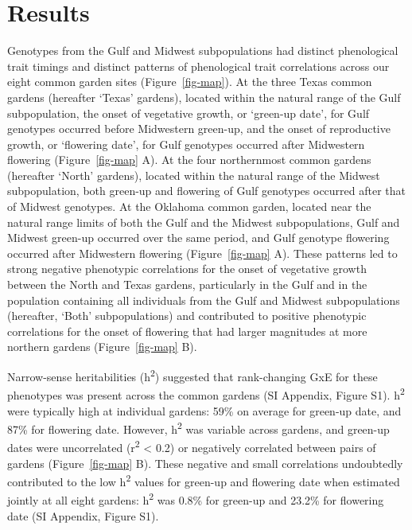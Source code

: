\documentclass[
  9pt,
  twocolumn,
  twoside]{pnas-new}
\begin{document}
\section{Results}\label{results}

Genotypes from the Gulf and Midwest subpopulations had distinct
phenological trait timings and distinct patterns of phenological trait
correlations across our eight common garden sites
(Figure~\ref{fig-map}). At the three Texas common gardens (hereafter
`Texas' gardens), located within the natural range of the Gulf
subpopulation, the onset of vegetative growth, or `green-up date', for
Gulf genotypes occurred before Midwestern green-up, and the onset of
reproductive growth, or `flowering date', for Gulf genotypes occurred
after Midwestern flowering (Figure~\ref{fig-map} A). At the four
northernmost common gardens (hereafter `North' gardens), located within
the natural range of the Midwest subpopulation, both green-up and
flowering of Gulf genotypes occurred after that of Midwest genotypes. At
the Oklahoma common garden, located near the natural range limits of
both the Gulf and the Midwest subpopulations, Gulf and Midwest green-up
occurred over the same period, and Gulf genotype flowering occurred
after Midwestern flowering (Figure~\ref{fig-map} A). These patterns led
to strong negative phenotypic correlations for the onset of vegetative
growth between the North and Texas gardens, particularly in the Gulf and
in the population containing all individuals from the Gulf and Midwest
subpopulations (hereafter, `Both' subpopulations) and contributed to
positive phenotypic correlations for the onset of flowering that had
larger magnitudes at more northern gardens (Figure~\ref{fig-map} B).

Narrow-sense heritabilities (h\textsuperscript{2}) suggested that
rank-changing GxE for these phenotypes was present across the common
gardens (SI Appendix, Figure S1). h\textsuperscript{2} were typically
high at individual gardens: 59\% on average for green-up date, and 87\%
for flowering date. However, h\textsuperscript{2} was variable across
gardens, and green-up dates were uncorrelated (r\textsuperscript{2}
\textless{} 0.2) or negatively correlated between pairs of gardens
(Figure~\ref{fig-map} B). These negative and small correlations
undoubtedly contributed to the low h\textsuperscript{2} values for
green-up and flowering date when estimated jointly at all eight gardens:
h\textsuperscript{2} was 0.8\% for green-up and 23.2\% for flowering
date (SI Appendix, Figure S1).
\end{document}

